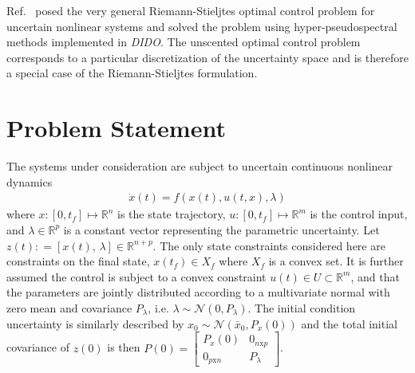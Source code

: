 \documentclass[10pt,a4paper]{article}
\begin{document}
	Ref.~\cite{RSOptimalControl} posed the very general Riemann-Stieljtes optimal control problem for uncertain nonlinear systems and solved the problem using hyper-pseudospectral methods implemented in \textit{DIDO}. The unscented optimal control problem corresponds to a particular discretization of the uncertainty space and is therefore a special case of the Riemann-Stieljtes formulation.
	
		
		
	
	
		
	\section{Problem Statement}
	
	The systems under consideration are subject to uncertain continuous nonlinear dynamics 
	\begin{align}
	\dot{x}(t) = f(x(t),u(t,x),\lambda) \label{eq_dynamics}
	\end{align}
	where $x:[0,t_f]\mapsto \mathbb{R}^n$ is the state trajectory, $u:[0,t_f]\mapsto \mathbb{R}^m$ is the control input, and $\lambda\in\mathbb{R}^p$ is a constant vector representing the parametric uncertainty. Let $z(t)\mathrel{:}=[x(t),\, \lambda]\in\mathbb{R}^{n+p}$. The only state constraints considered here are constraints on the final state, $x(t_f)\in X_f$ where $X_f$ is a convex set. It is further assumed the control is subject to a convex constraint $u(t) \in U \subset \mathbb{R}^m$, and that the parameters are jointly distributed according to a multivariate normal with zero mean and covariance $P_{\lambda}$, i.e. $\lambda \sim \mathcal{N}(0,P_{\lambda})$. The initial condition uncertainty is similarly described by $x_0 \sim \mathcal{N}(\bar{x}_0,P_x(0))$ and the total initial covariance of $z(0)$ is then $P(0) = \left[\begin{array}{cc}
		P_{x}(0)& 0_{n\mathrm{x}p} \\
		 0_{p\mathrm{x}n} & P_{\lambda}
		\end{array}\right]$.
	
\end{document}
